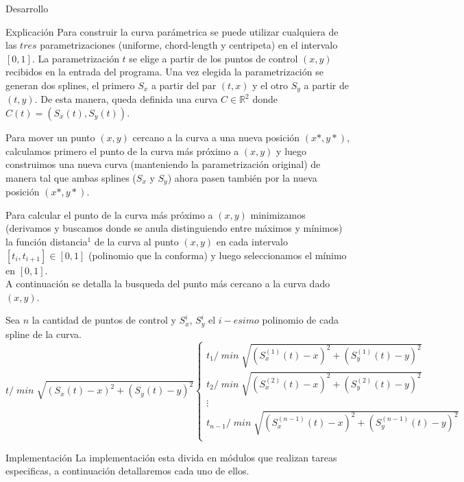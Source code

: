 \begin{section}{Desarrollo}
	\begin{subsection}{Explicación}
		Para construir la curva parámetrica se puede utilizar cualquiera de las $tres$ parametrizaciones (uniforme, chord-length y centripeta) en el intervalo $[0,1]$.
		La parametrización $t$ se elige a partir de los puntos de control $(x,y)$ recibidos en la entrada del programa.
		Una vez elegida la parametrización se generan dos splines, el primero $S_x$ a partir del par $(t,x)$ y el otro $S_y$ a partir de $(t,y)$.
		De esta manera, queda definida una curva $C \in \mathbb{R}^2$ donde $C(t) = (S_x(t),S_y(t))$.
		
		Para mover un punto $(x,y)$ cercano a la curva a una nueva posición $(x*,y*)$, calculamos primero el punto de la curva más próximo a $(x,y)$ y luego construimos una nueva curva (manteniendo la parametrización original) de manera tal que ambas splines ($S_x$ y $S_y$) ahora pasen también por la nueva posición $(x*,y*)$.
		
		Para calcular el punto de la curva más próximo a $(x,y)$ minimizamos (derivamos y buscamos donde se anula distinguiendo entre máximos y mínimos) la	función distancia$^1$ de la curva al punto $(x,y)$ en cada intervalo $[t_i,t_{i+1}] \in [0,1]$ (polinomio que la conforma) y luego seleccionamos el mínimo en $[0,1]$.\\
		
		A continuación se detalla la busqueda del punto más cercano a la curva dado $(x,y)$.
		
		Sea $n$ la cantidad de puntos de control y $S_x^i$, $S_y^i$ el $i-esimo$ polinomio de cada spline de la curva.\\
		 
		$t /\; min\; \sqrt{(S_x(t)-x)^2+(S_y(t)-y)^2} \left\{
		\begin{array}{c}
		t_1 /\; min\; \sqrt{(S_x^{(1)}(t)-x)^2+(S_y^{(1)}(t)-y)^2}\\
		t_2 /\; min\; \sqrt{(S_x^{(2)}(t)-x)^2+(S_y^{(2)}(t)-y)^2}\\
		\vdots\\
		t_{n-1} /\; min\; \sqrt{(S_x^{(n-1)}(t)-x)^2+(S_y^{(n-1)}(t)-y)^2}\\
		\end{array}
		\right.$
		\VSP		
	\end{subsection}
	\begin{subsection}{Implementación}
		La implementación esta divida en módulos que realizan tareas especificas, a continuación detallaremos cada uno de ellos.
		

\end{subsection}
\end{section}
